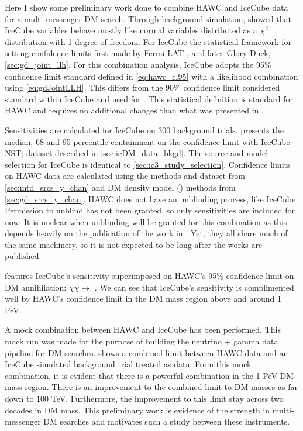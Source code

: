Here I show some preliminary work done to combine HAWC and IceCube data for a multi-messenger DM search.
Through background simulation,  showed that IceCube variables behave mostly like normal variables distributed as a $\chi^2$ distribution with 1 degree of freedom.
For IceCube the statistical framework for setting confidence limits first made by Fermi-LAT \cite{FermiLAT:dm1}, and later Glory Duck, \cref{sec:gd_joint_llh}.
For this combination analysis, IceCube adopts the 95\% confidence limit standard defined in \cref{eq:hawc_cl95} with a likelihood combination using \cref{eq:gdJointLLH}.
This differs from the 90\% confidence limit considered standard within IceCube and used for .
This statistical definition is standard for HAWC and requires no additional changes than what was presented in .

Sensitivities are calculated for IceCube on 300 background trials.  presents the median, 68 and 95 percentile containment on the confidence limit with IceCube NST; dataset described in \cref{sec:icDM_data_bkgd}.
The source and model selection for IceCube is identical to \cref{sec:ic3_study_selection}.
Confidence limits on HAWC data are calculated using the methods and dataset from \cref{sec:mtd_srcs_y_chan} and DM density model (\GS) methods from \cref{sec:gd_srcs_y_chan}.
HAWC does not have an unblinding process, like IceCube.
Permission to unblind has not been granted, so only sensitivities are included for now.
It is unclear when unblinding will be granted for this combination as this depends heavily on the publication of the work in .
Yet, they all share much of the same machinery, so it is not expected to be long after the works are published.

 features IceCube's sensitivity superimposed on HAWC's 95\% confidence limit on DM annihilation: $\chi\chi \rightarrow$ \parpar{\nu_\mu}.
We can see that IceCube's sensitivity is complimented well by HAWC's confidence limit in the DM mass region above and around 1 PeV.

A mock combination between HAWC and IceCube has been performed.
This mock run was made for the purpose of building the neutrino + gamma data pipeline for DM searches.
 shows a combined limit between HAWC data and an IceCube simulated background trial treated as data.
From this mock combination, it is evident that there is a powerful combination in the 1 PeV DM mass region.
There is an improvement to the combined limit to DM masses as far down to 100 TeV.
Furthermore, the improvement to this limit stay across two decades in DM mass.
This preliminary work is evidence of the strength in multi-messenger DM searches and motivates such a study between these instruments.

